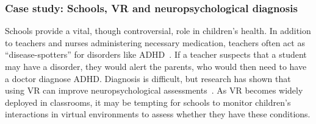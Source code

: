 




\subsubsection{Case study: Schools, VR and neuropsychological diagnosis}

Schools provide a vital, though controversial, role in children's health. In addition to teachers and nurses administering necessary medication, teachers often act as ``disease-spotters'' for disorders like ADHD~\cite{phillips2006medicine}. If a teacher suspects that a student may have a disorder, they would alert the parents, who would then need to have a doctor diagnose ADHD. Diagnosis is difficult, but research has shown that using VR can improve neuropsychological assessments~\cite{areces2018analysis}. As VR becomes widely deployed in classrooms, it may be tempting for schools to monitor children's interactions in virtual environments to assess whether they have these conditions.

